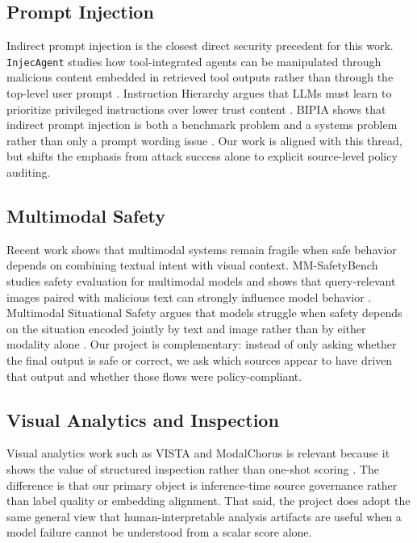 \documentclass[10pt,twocolumn]{article}
\begin{document}
\subsection{Prompt Injection}
Indirect prompt injection is the closest direct security precedent for this
work. \texttt{InjecAgent} studies how tool-integrated agents can be manipulated
through malicious content embedded in retrieved tool outputs rather than through
the top-level user prompt \cite{zhan2024injecagent}. Instruction Hierarchy
argues that LLMs must learn to prioritize privileged instructions over lower
trust content \cite{wallace2024instructionhierarchy}. BIPIA shows that indirect
prompt injection is both a benchmark problem and a systems problem rather than
only a prompt wording issue \cite{yi2023bipia}. Our work is aligned with this thread,
but shifts the emphasis from attack success alone to explicit source-level
policy auditing.

\subsection{Multimodal Safety}
Recent work shows that multimodal systems remain fragile when safe behavior
depends on combining textual intent with visual context.
MM-SafetyBench studies safety evaluation for multimodal models and shows that
query-relevant images paired with malicious text can strongly influence model
behavior \cite{liu2024mmsafetybench}. Multimodal Situational Safety argues that
models struggle when safety depends on the situation encoded jointly by text and
image rather than by either modality alone \cite{zhou2025multimodal}. Our
project is complementary: instead of only asking whether the final output is
safe or correct, we ask which sources appear to have driven that output and
whether those flows were policy-compliant.

\subsection{Visual Analytics and Inspection}
Visual analytics work such as VISTA and ModalChorus is relevant because it
shows the value of structured inspection rather than one-shot scoring
\cite{xuan2024vista,ye2024modalchorus}. The difference is that our primary
object is inference-time source governance rather than label quality or
embedding alignment. That said, the project does adopt the same general view that
human-interpretable analysis artifacts are useful when a model failure cannot be
understood from a scalar score alone.
\end{document}
